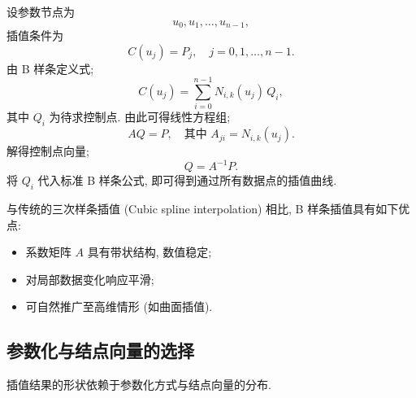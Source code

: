 \documentclass[12pt,a4paper]{article}
\begin{document}
            设参数节点为
            \begin{equation*}
                u_0, u_1, \dots, u_{n-1},
            \end{equation*}
            插值条件为
            \begin{equation*}
                C(u_j) = P_j, \quad j = 0, 1, \dots, n-1.
            \end{equation*}
            由 B 样条定义式;
            \begin{equation*}
                C(u_j) = \sum_{i=0}^{n-1} N_{i,k}(u_j) \, Q_i,
            \end{equation*}
            其中 \( Q_i \) 为待求控制点. 由此可得线性方程组;
            \begin{equation*}
                A Q = P, \quad \text{其中 } A_{ji} = N_{i,k}(u_j).
            \end{equation*}
            解得控制点向量;
            \begin{equation*}
                Q = A^{-1} P.
            \end{equation*}
            将 $Q_i$ 代入标准 B 样条公式, 即可得到通过所有数据点的插值曲线.

            与传统的三次样条插值 (Cubic spline interpolation) 相比, B 样条插值具有如下优点:
            \begin{itemize}
                \item 系数矩阵 $A$ 具有带状结构, 数值稳定;
                \item 对局部数据变化响应平滑;
                \item 可自然推广至高维情形 (如曲面插值).
            \end{itemize}

        \subsection{参数化与结点向量的选择}
            插值结果的形状依赖于参数化方式与结点向量的分布.
\end{document}
